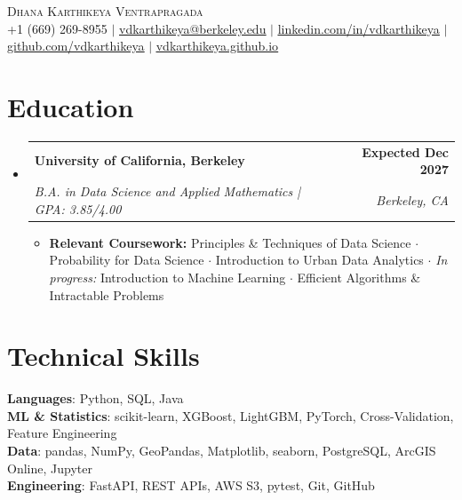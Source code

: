 \documentclass[letterpaper,11pt]{article}
\makeatletter
\newcommand{\resumeItem}[1]{
  \item\small{
    {#1 \vspace{-2pt}}
  }
}
\newcommand{\resumeSubheading}[4]{
  \vspace{-2pt}\item
    \begin{tabular*}{1.0\textwidth}[t]{l@{\extracolsep{\fill}}r}
      \textbf{#1} & \textbf{\small #2} \\
      \textit{\small#3} & \textit{\small #4} \\
    \end{tabular*}\vspace{-7pt}
}
\newcommand{\resumeSubHeadingListStart}{\begin{itemize}[leftmargin=0.0in, label={}]}
\newcommand{\resumeSubHeadingListEnd}{\end{itemize}}
\newcommand{\resumeItemListStart}{\begin{itemize}[itemsep=2.5pt, topsep=3pt]}
\newcommand{\resumeItemListEnd}{\end{itemize}\vspace{-4pt}}
\makeatother
\begin{document}
\begin{center}
    {\Huge \scshape Dhana Karthikeya Ventrapragada} \\ \vspace{1pt}
        \footnotesize
    +1 (669) 269-8955 $|$
    \href{mailto:vdkarthikeya@berkeley.edu}{\uline{vdkarthikeya@berkeley.edu}} $|$
    \href{https://www.linkedin.com/in/vdkarthikeya/}{\uline{linkedin.com/in/vdkarthikeya}} $|$
    \href{https://github.com/vdkarthikeya}{\uline{github.com/vdkarthikeya}} $|$
    \href{https://vdkarthikeya.github.io}{\uline{vdkarthikeya.github.io}}
    \vspace{-8pt}
\end{center}

\section{Education}
\resumeSubHeadingListStart

\resumeSubheading
{University of California, Berkeley}{Expected Dec 2027}
{B.A. in Data Science and Applied Mathematics \;|\; GPA: 3.85/4.00}{Berkeley, CA}

\vspace{-6pt}
\resumeItemListStart
\resumeItem{\textbf{Relevant Coursework:} Principles \& Techniques of Data Science $\cdot$ Probability for Data Science $\cdot$ Introduction to Urban Data Analytics $\cdot$ \textit{In progress:} Introduction to Machine Learning $\cdot$ Efficient Algorithms \& Intractable Problems}
\resumeItemListEnd

\resumeSubHeadingListEnd
\vspace{-14pt}

\section{Technical Skills}
 \begin{itemize}[leftmargin=0.15in, label={}, itemsep=3pt]
    \small{\item{
     \textbf{Languages}{: Python, SQL, Java} \\[2pt]
     \textbf{ML \& Statistics}{: scikit-learn, XGBoost, LightGBM, PyTorch, Cross-Validation, Feature Engineering} \\[2pt]
     \textbf{Data}{: pandas, NumPy, GeoPandas, Matplotlib, seaborn, PostgreSQL, ArcGIS Online, Jupyter} \\[2pt]
     \textbf{Engineering}{: FastAPI, REST APIs, AWS S3, pytest, Git, GitHub}
    }}
 \end{itemize}
 \vspace{-15pt}
\end{document}
